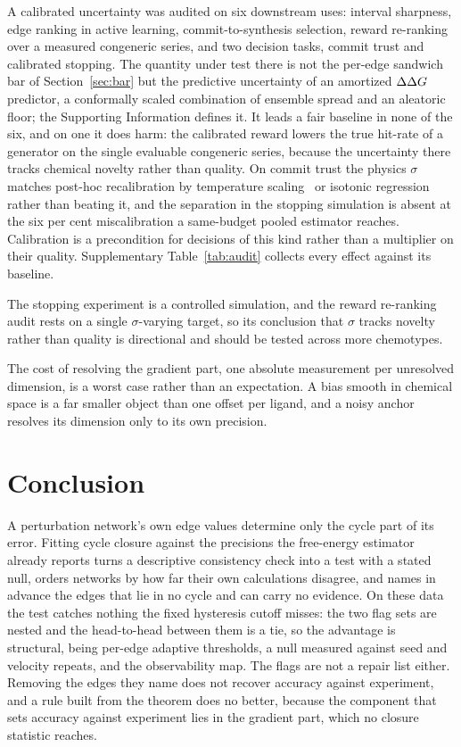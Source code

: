 A calibrated uncertainty was audited on six downstream uses: interval sharpness, edge ranking in
active learning, commit-to-synthesis selection, reward re-ranking over a measured congeneric
series, and two decision tasks, commit trust and calibrated stopping. The quantity under test there
is not the per-edge sandwich bar of Section~\ref{sec:bar} but the predictive uncertainty of an
amortized $\Delta\Delta G$ predictor, a conformally scaled combination of ensemble spread and an aleatoric
floor; the Supporting Information defines it. It leads a fair baseline in none of the six, and on
one it does harm: the calibrated reward lowers the true hit-rate of a generator on the single
evaluable congeneric series, because the uncertainty there tracks chemical novelty rather than
quality. On commit trust the physics $\sigma$ matches post-hoc recalibration by temperature
scaling~\citep{guo2017calibration} or isotonic regression~\citep{zadrozny2002isotonic} rather than
beating it, and the separation in the stopping simulation is absent at the six per cent
miscalibration a same-budget pooled estimator reaches. Calibration is a precondition for decisions of this kind rather than a
multiplier on their quality. Supplementary Table~\ref{tab:audit} collects every effect against its
baseline.

The stopping experiment is a controlled simulation, and the reward re-ranking audit rests on a
single $\sigma$-varying target, so its conclusion that $\sigma$ tracks novelty rather than quality
is directional and should be tested across more chemotypes.

The cost of resolving the gradient part, one absolute measurement per unresolved dimension, is a
worst case rather than an expectation. A bias smooth in chemical space is a far smaller object than
one offset per ligand, and a noisy anchor resolves its dimension only to its own precision.

\section{Conclusion}\label{sec:conclusion}
A perturbation network's own edge values determine only the cycle part of its error. Fitting cycle
closure against the precisions the free-energy estimator already reports turns a descriptive
consistency check into a test with a stated null, orders networks by how far their own calculations
disagree, and names in advance the edges that lie in no cycle and can carry no evidence. On these
data the test catches nothing the fixed hysteresis cutoff misses: the two flag sets are nested and
the head-to-head between them is a tie, so the advantage is structural, being per-edge adaptive
thresholds, a null measured against seed and velocity repeats, and the observability map. The flags
are not a repair list either. Removing the edges they name does not recover accuracy against
experiment, and a rule built from the theorem does no better, because the component that sets
accuracy against experiment lies in the gradient part, which no closure statistic reaches.

